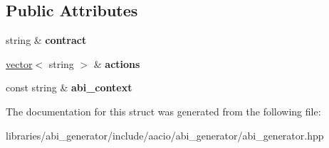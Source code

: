 \subsection*{Public Attributes}
\begin{DoxyCompactItemize}
\item 
\mbox{\label{structaacio_1_1find__aacio__abi__macro__action_ad0e6c2a45a186a48679d5a702f816b66}} 
string \& {\bfseries contract}
\item 
\mbox{\label{structaacio_1_1find__aacio__abi__macro__action_ac04529f5ad9e8f75ab178e3fb81b751e}} 
\mbox{\hyperlink{classstd_1_1vector}{vector}}$<$ string $>$ \& {\bfseries actions}
\item 
\mbox{\label{structaacio_1_1find__aacio__abi__macro__action_a64f91fb12a9fb588747d61bba2c04f87}} 
const string \& {\bfseries abi\+\_\+context}
\end{DoxyCompactItemize}


The documentation for this struct was generated from the following file\+:\begin{DoxyCompactItemize}
\item 
libraries/abi\+\_\+generator/include/aacio/abi\+\_\+generator/abi\+\_\+generator.\+hpp\end{DoxyCompactItemize}
